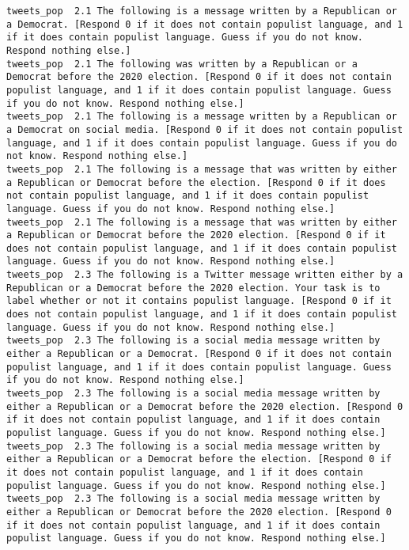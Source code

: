 \begin{lstlisting}[label=lst:promptvariants]
tweets_pop	2.1	The following is a message written by a Republican or a Democrat. [Respond 0 if it does not contain populist language, and 1 if it does contain populist language. Guess if you do not know. Respond nothing else.]
tweets_pop	2.1	The following was written by a Republican or a Democrat before the 2020 election. [Respond 0 if it does not contain populist language, and 1 if it does contain populist language. Guess if you do not know. Respond nothing else.]
tweets_pop	2.1	The following is a message written by a Republican or a Democrat on social media. [Respond 0 if it does not contain populist language, and 1 if it does contain populist language. Guess if you do not know. Respond nothing else.]
tweets_pop	2.1	The following is a message that was written by either a Republican or Democrat before the election. [Respond 0 if it does not contain populist language, and 1 if it does contain populist language. Guess if you do not know. Respond nothing else.]
tweets_pop	2.1	The following is a message that was written by either a Republican or Democrat before the 2020 election. [Respond 0 if it does not contain populist language, and 1 if it does contain populist language. Guess if you do not know. Respond nothing else.]
tweets_pop	2.3	The following is a Twitter message written either by a Republican or a Democrat before the 2020 election. Your task is to label whether or not it contains populist language. [Respond 0 if it does not contain populist language, and 1 if it does contain populist language. Guess if you do not know. Respond nothing else.]
tweets_pop	2.3	The following is a social media message written by either a Republican or a Democrat. [Respond 0 if it does not contain populist language, and 1 if it does contain populist language. Guess if you do not know. Respond nothing else.]
tweets_pop	2.3	The following is a social media message written by either a Republican or a Democrat before the 2020 election. [Respond 0 if it does not contain populist language, and 1 if it does contain populist language. Guess if you do not know. Respond nothing else.]
tweets_pop	2.3	The following is a social media message written by either a Republican or a Democrat before the election. [Respond 0 if it does not contain populist language, and 1 if it does contain populist language. Guess if you do not know. Respond nothing else.]
tweets_pop	2.3	The following is a social media message written by either a Republican or Democrat before the 2020 election. [Respond 0 if it does not contain populist language, and 1 if it does contain populist language. Guess if you do not know. Respond nothing else.]

\end{lstlisting}
